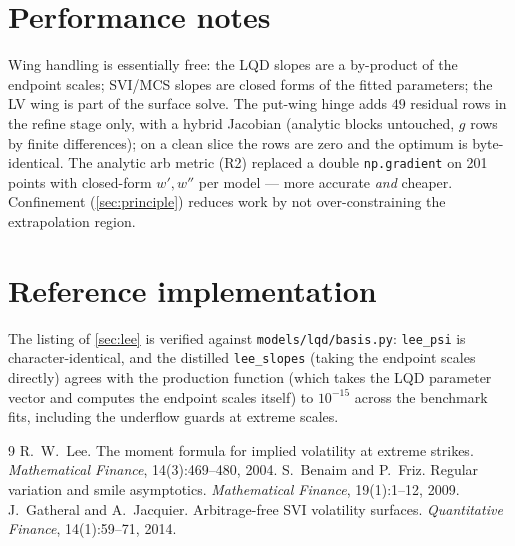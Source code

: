 \documentclass[11pt]{article}
\begin{document}
\section{Performance notes}
\label{app:perf}

Wing handling is essentially free: the LQD slopes are a by-product of the
endpoint scales; SVI/MCS slopes are closed forms of the fitted parameters;
the LV wing is part of the surface solve. The put-wing hinge adds $49$
residual rows in the refine stage only, with a hybrid Jacobian (analytic
blocks untouched, $g$ rows by finite differences); on a clean slice the rows
are zero and the optimum is byte-identical. The analytic arb metric (R2)
replaced a double \texttt{np.gradient} on 201 points with closed-form
$w',w''$ per model --- more accurate \emph{and} cheaper. Confinement
(\cref{sec:principle}) reduces work by not over-constraining the
extrapolation region.

\section{Reference implementation}
\label{app:ref}

The listing of \cref{sec:lee} is verified against
\texttt{models/lqd/basis.py}: \texttt{lee\_psi} is character-identical, and
the distilled \texttt{lee\_slopes} (taking the endpoint scales directly)
agrees with the
production function (which takes the LQD parameter vector and computes the
endpoint scales itself) to $10^{-15}$ across the benchmark fits, including
the underflow guards at extreme scales.

\begin{thebibliography}{9}
 R.~W.~Lee. The moment formula for implied volatility at
extreme strikes. \emph{Mathematical Finance}, 14(3):469--480, 2004.
 S.~Benaim and P.~Friz. Regular variation and smile
asymptotics. \emph{Mathematical Finance}, 19(1):1--12, 2009.
 J.~Gatheral and A.~Jacquier. Arbitrage-free
SVI volatility surfaces. \emph{Quantitative Finance}, 14(1):59--71, 2014.
\end{thebibliography}
\end{document}
